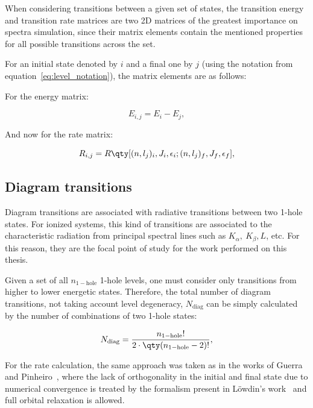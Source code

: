When considering transitions between a given set of states, the transition energy and transition rate matrices are two 2D matrices of the greatest importance on spectra simulation, since their matrix elements contain the mentioned properties for all possible transitions across the set.

For an initial state denoted by $i$ and a final one by $j$ (using the notation from equation~\eqref{eq:level_notation}), the matrix elements are as follows:

For the energy matrix:

\begin{equation}
    E_{i,j} = E_i - E_j , 
\end{equation}

And now for the rate matrix:

\begin{equation}
    R_{i,j}=R\qty[(n,l_j)_i,J_i,\epsilon_i;(n,l_j)_f,J_f,\epsilon_f],
\end{equation}

\subsection{Diagram transitions}

Diagram transitions are associated with radiative transitions between two 1-hole states. For ionized systems, this kind of transitions are associated to the characteristic radiation from principal spectral lines such as $K_{\alpha},\ K_{\beta}, L$, etc. For this reason, they are the focal point of study for the work performed on this thesis.

Given a set of all $n_{1-\text{hole}}$ 1-hole levels, one must consider only transitions from higher to lower energetic states. Therefore, the total number of diagram transitions, not taking account level degeneracy, $N_{\text{diag}}$ can be simply calculated by the number of combinations of two 1-hole states:

\begin{equation}
    N_{\text{diag}} = \frac{n_{1-\text{hole}}!}{2\cdot\qty(n_{1-\text{hole}}-2)!},
\end{equation}



For the rate calculation, the same approach was taken as in the works of Guerra~\cite{Guerra2021} and Pinheiro~\cite{Pinheiro2023}, where the lack of orthogonality in the initial and final state due to numerical convergence is treated by the formalism present in Löwdin's work~\cite{Lowdin1955} and full orbital relaxation is allowed.

